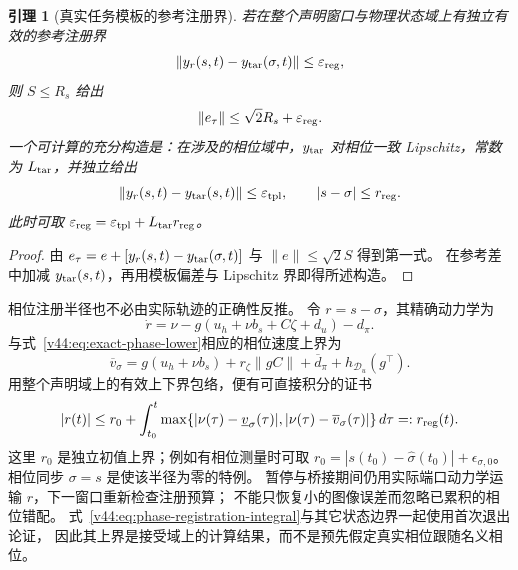 \documentclass[11pt,a4paper]{article}
\numberwithin{equation}{section}
\newtheorem{lemma}[theorem]{引理}
\theoremstyle{definition}
\begin{document}
\begin{lemma}[真实任务模板的参考注册界]
\label{v44:lem:reference-registration}
若在整个声明窗口与物理状态域上有独立有效的参考注册界
\begin{equation}
 \|y_r(s,t)-y_{\rm tar}(\sigma,t)\|\le\varepsilon_{\rm reg},
 \label{v44:eq:reference-registration-budget}
\end{equation}
则 $S\le R_s$ 给出
\begin{equation}
 \|e_\tau\|\le\sqrt2R_s+\varepsilon_{\rm reg}.
 \label{v44:eq:actual-template-guarantee}
\end{equation}
一个可计算的充分构造是：在涉及的相位域中，$y_{\rm tar}$ 对相位一致 Lipschitz，常数为
$L_{\rm tar}$，并独立给出
\begin{equation}
 \|y_r(s,t)-y_{\rm tar}(s,t)\|\le\varepsilon_{\rm tpl},\qquad
 |s-\sigma|\le r_{\rm reg}.
\end{equation}
此时可取 $\varepsilon_{\rm reg}=\varepsilon_{\rm tpl}+L_{\rm tar}r_{\rm reg}$。
\end{lemma}
\begin{proof}
由 $e_\tau=e+[y_r(s,t)-y_{\rm tar}(\sigma,t)]$ 与 $\|e\|\le\sqrt2S$ 得到第一式。
在参考差中加减 $y_{\rm tar}(s,t)$，再用模板偏差与 Lipschitz 界即得所述构造。
\end{proof}

相位注册半径也不必由实际轨迹的正确性反推。
令 $r=s-\sigma$，其精确动力学为
\begin{equation}
 \dot r=\nu-g(u_h+\nu b_s+C\zeta+d_u)-d_\pi.
 \label{v44:eq:phase-registration-dynamics}
\end{equation}
与式~\eqref{v44:eq:exact-phase-lower}相应的相位速度上界为
\begin{equation}
 \overline v_\sigma
 =g(u_h+\nu b_s)+r_\zeta\|gC\|+\overline d_\pi
       +h_{\mathcal D_u}(g^\top).
\end{equation}
用整个声明域上的有效上下界包络，便有可直接积分的证书
\begin{equation}
 |r(t)|\le r_0+
 \int_{t_0}^{t}
 \max\{|\nu(\tau)-\underline v_\sigma(\tau)|,
        |\nu(\tau)-\overline v_\sigma(\tau)|\}\,d\tau
 =:r_{\rm reg}(t).
 \label{v44:eq:phase-registration-integral}
\end{equation}
这里 $r_0$ 是独立初值上界；例如有相位测量时可取
$r_0=|s(t_0)-\widehat\sigma(t_0)|+\epsilon_{\sigma,0}$。
相位同步 $\sigma=s$ 是使该半径为零的特例。
暂停与桥接期间仍用实际端口动力学运输 $r$，下一窗口重新检查注册预算；
不能只恢复小的图像误差而忽略已累积的相位错配。
式~\eqref{v44:eq:phase-registration-integral}与其它状态边界一起使用首次退出论证，
因此其上界是接受域上的计算结果，而不是预先假定真实相位跟随名义相位。
\end{document}
